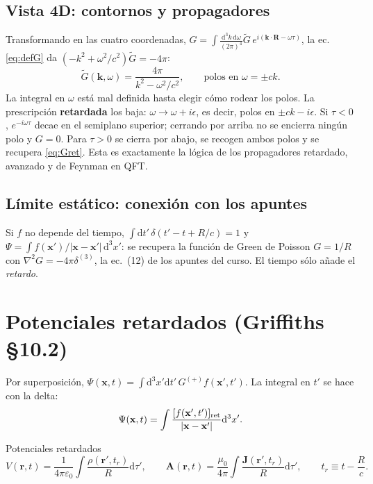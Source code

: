 \documentclass[11pt,a4paper]{article}
\newcommand{\rr}{\mathbf r}
\newcommand{\dd}{\mathrm d}
\theoremstyle{remark}
\begin{document}
\subsection{Vista 4D: contornos y propagadores}

Transformando en las cuatro coordenadas,
$G=\int\frac{\dd^3k\,\dd\omega}{(2\pi)^4}\tilde G\,e^{i(\mathbf k\cdot\mathbf R-\omega\tau)}$, la ec.
\eqref{eq:defG} da $(-k^2+\omega^2/c^2)\tilde G=-4\pi$:
\begin{equation}
\tilde G(\mathbf k,\omega)=\frac{4\pi}{k^2-\omega^2/c^2},\qquad\text{polos en }\omega=\pm ck.
\end{equation}
La integral en $\omega$ está mal definida hasta elegir cómo rodear los polos. La prescripción
\textbf{retardada} los baja: $\omega\to\omega+i\epsilon$, es decir, polos en $\pm ck-i\epsilon$. Si
$\tau<0$, $e^{-i\omega\tau}$ decae en el semiplano superior; cerrando por arriba no se encierra ningún
polo y $G=0$. Para $\tau>0$ se cierra por abajo, se recogen ambos polos y se recupera
\eqref{eq:Gret}. Esta es exactamente la lógica de los propagadores retardado, avanzado y de Feynman en
QFT.

\subsection{Límite estático: conexión con los apuntes}

Si $f$ no depende del tiempo, $\int\dd t'\,\delta(t'-t+R/c)=1$ y
$\Psi=\int f(\mathbf x')/|\mathbf x-\mathbf x'|\,\dd^3x'$: se recupera la función de Green de Poisson
$G=1/R$ con $\nabla^2G=-4\pi\delta^{(3)}$, la ec.~(12) de los apuntes del curso. El tiempo sólo añade
el \emph{retardo}.

\section{Potenciales retardados (Griffiths §10.2)}

Por superposición, $\Psi(\mathbf x,t)=\int\dd^3x'\dd t'\,G^{(+)}f(\mathbf x',t')$. La integral en $t'$
se hace con la delta:
\begin{equation}
\Psi(\mathbf x,t)=\int\frac{[f(\mathbf x',t')]_{\rm ret}}{|\mathbf x-\mathbf x'|}\dd^3x'.
\end{equation}

\begin{resbox}{Potenciales retardados}
\begin{equation}
V(\rr,t)=\frac1{4\pi\varepsilon_0}\int\frac{\rho(\rr',t_r)}{R}\dd\tau',\qquad
\mathbf A(\rr,t)=\frac{\mu_0}{4\pi}\int\frac{\mathbf J(\rr',t_r)}{R}\dd\tau',\qquad
t_r\equiv t-\frac{R}{c}.
\label{eq:retard}
\end{equation}
\end{resbox}
\end{document}
